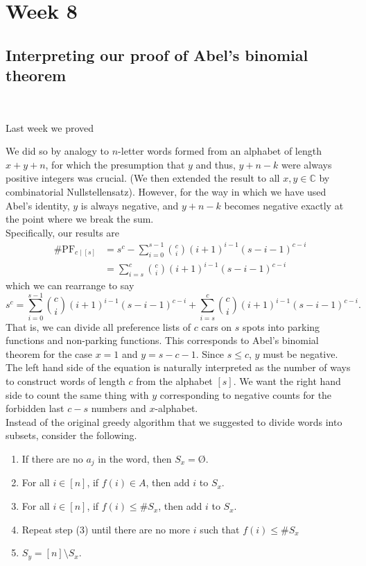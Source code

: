 \section{Week 8}

\subsection*{Interpreting our proof of Abel's binomial theorem}~

Last week we proved \abelsbin*

We did so by analogy to $n$-letter words formed from an alphabet of length $x + y + n$, for which the presumption that $y$ and thus, $y + n - k$ were always positive integers was crucial. (We then extended the result to all $x, y \in \mathbb{C}$ by combinatorial Nullstellensatz). However, for the way in which we have used Abel's identity, $y$ is always negative, and $y + n - k$ becomes negative exactly at the point where we break the sum. \\

Specifically, our results are
\[
	\begin{split}
		\# \mathrm{PF}_{c \mid [s]} & = s^{c} - \sum_{i = 0}^{s - 1} \binom{c}{i} (i + 1)^{i - 1} (s - i - 1)^{c - i} \\
					    & = \sum_{i = s}^{c} \binom{c}{i} (i + 1)^{i - 1} (s - i - 1)^{c - i}
	\end{split}
\]
which we can rearrange to say
\[
	s^{c} = \sum_{i = 0}^{s - 1} \binom{c}{i} (i + 1)^{i - 1} (s - i - 1)^{c - i} + \sum_{i = s}^{c} \binom{c}{i} (i + 1)^{i - 1} (s - i - 1)^{c - i}.
\]
That is, we can divide all preference lists of $c$ cars on $s$ spots into parking functions and non-parking functions. This corresponds to Abel's binomial theorem for the case $x = 1$ and $y = s - c - 1$. Since $s \le c$, $y$ must be negative. The left hand side of the equation is naturally interpreted as the number of ways to construct words of length $c$ from the alphabet $[s]$. We want the right hand side to count the same thing with $y$ corresponding to negative counts for the forbidden last $c - s$ numbers and $x$-alphabet. \\

Instead of the original greedy algorithm that we suggested to divide words into subsets, consider the following.

\begin{enumerate}[label = (\arabic*)]
	\item If there are no $a_{j}$ in the word, then $S_{x} = \text{\O}$.
	\item For all $i \in [n]$, if $f(i) \in A$, then add $i$ to $S_{x}$.
	\item For all $i \in [n]$, if $f(i) \le \# S_{x}$, then add $i$ to $S_{x}$.
	\item Repeat step (3) until there are no more $i$ such that $f(i) \le \# S_{x}$
	\item $S_{y} = [n] \setminus S_{x}$.
\end{enumerate}

